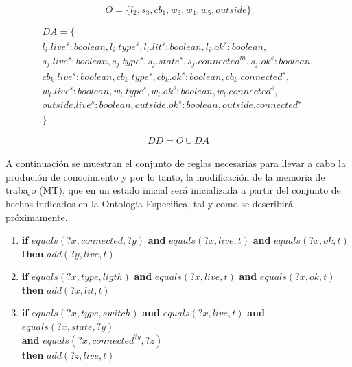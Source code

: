 \documentclass[10pt, a4paper,spanish]{article}
\begin{document}
			\begin{equation*}
				O = \{l_2, s_3, cb_1, w_3,w_4, w_5, outside\}
			\end{equation*}

			\begin{multline*}
				DA = \{ \\
					l_i.live^s:boolean, l_i.type^s, l_i.lit^s:boolean, l_i.ok^s:boolean, \\
					s_j.live^s:boolean, s_j.type^s, s_j.state^s, s_j.connected^m, s_j.ok^s:boolean, \\
					cb_k.live^s:boolean, cb_k.type^s, cb_k.ok^s:boolean, cb_k.connected^s, \\
					w_l.live^s:boolean, w_l.type^s, w_l.ok^s:boolean, w_l.connected^s, \\
					outside.live^s:boolean, outside.ok^s:boolean, outside.connected^s \\
				\}
			\end{multline*}

			\begin{equation*}
				DD = O \cup DA
			\end{equation*}

			\paragraph{}
			A continuación se muestran el conjunto de reglas necesarias para llevar a cabo la produción de conocimiento y por lo tanto, la modificación de la memoria de trabajo (MT), que en un estado inicial será inicializada a partir del conjunto de hechos indicados en la Ontología Especifica, tal y como se describirá próximamente.

			\begin{enumerate}
				\item
					\textbf{if} $equals(?x, connected, ?y)$ \textbf{and} $equals(?x, live, t)$ \textbf{and} $equals(?x, ok, t)$ \\
					\textbf{then} $add(?y, live, t)$

				\item
					\textbf{if} $equals(?x, type, ligth)$ \textbf{and} $equals(?x, live, t)$ \textbf{and} $equals(?x, ok, t)$ \\
					\textbf{then} $add(?x, lit, t)$

				\item
					\textbf{if} $equals(?x, type, switch)$ \textbf{and} $equals(?x, live, t)$ \textbf{and} $equals(?x, state, ?y)$ \\
					\hspace*{0.5cm} \textbf{and} $equals(?x, connected^{?y}, ?z)$ \\
					\textbf{then} $add(?z, live, t)$

			\end{enumerate}
\end{document}
